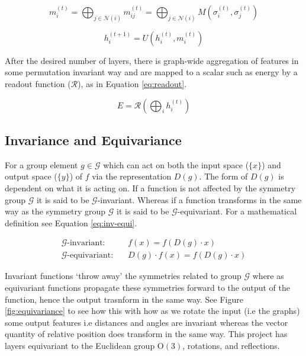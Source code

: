 \begin{equation} \label{eq:msg}
    m^{(t)}_i = \bigoplus_{j \in \mathcal N(i)} m^{(t)}_{ij} = \bigoplus_{j \in \mathcal N(i)} M(\sigma^{(t)}_i, \sigma^{(t)}_j)
\end{equation}


\begin{equation} \label{eq:up}
    h^{(t+1)}_i = U(h^{(t)}_i, m^{(t)}_i)
\end{equation}

After the desired number of layers, there is graph-wide aggregation of features in some permutation invariant way and are mapped to a scalar such as energy by a readout function ($\mathcal R$), as in Equation \ref{eq:readout}.


\begin{equation} \label{eq:readout}
    E = \mathcal R (\bigoplus_i h^{(t)}_i)
\end{equation}


\subsection{Invariance and Equivariance} 


For a group element $g \in \mathcal G$ which can act on both the input space ($\{x\}$) and output space ($\{y\}$) of $f$ via the representation $D(g)$. The form of $D(g)$ is dependent on what it is acting on. If a function is not affected by the symmetry group $\mathcal G$ it is said to be $\mathcal G$-invariant. Whereas if a function transforms in the same way as the symmetry group $\mathcal G$ it is said to be $\mathcal G$-equivariant. For a mathematical definition see Equation \ref{eq:inv-equi}. 

\begin{equation} \label{eq:inv-equi}
\begin{align*} 
\mathcal G\text{-invariant:}& \quad f(x) = f(D(g) \cdot x) \\ 
\mathcal G\text{-equivariant:}& \quad D(g) \cdot f(x) = f(D(g) \cdot x) 
\end{align*}
\end{equation}

Invariant functions `throw away' the symmetries related to group $\mathcal G$ where as equivariant functions propagate these symmetries forward to the output of the function, hence the output trasnform in the same way. See Figure \ref{fig:equivariance} to see how this with how as we rotate the input (i.e the graphs) some output features i.e distances and angles are invariant whereas the vector quantity of relative position does transform in the same way. This project has layers equivariant to the Euclidean group $\mathrm O(3)$, rotations, and reflections.

